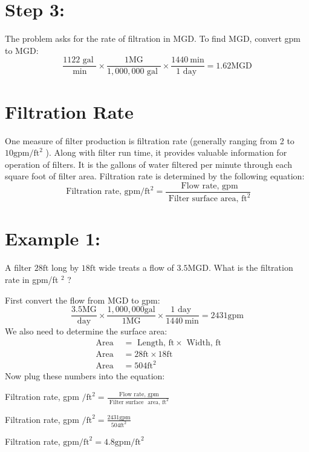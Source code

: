 \documentclass[10pt]{article}
\begin{document}
\section{Step 3:}
The problem asks for the rate of filtration in MGD. To find MGD, convert gpm to MGD:
$$
\frac{1122 \text { gal }}{\min } \times \frac{1 \mathrm{MG}}{1,000,000 \text { gal }} \times \frac{1440 \mathrm{~min}}{1 \text { day }}=1.62 \mathrm{MGD}
$$

\section{Filtration Rate}
One measure of filter production is filtration rate (generally ranging from 2 to $10 \mathrm{gpm} / \mathrm{ft}^{2}$ ). Along with filter run time, it provides valuable information for operation of filters. It is the gallons of water filtered per minute through each square foot of filter area. Filtration rate is determined by the following equation:
$$
\text { Filtration rate, } \mathrm{gpm} / \mathrm{ft}^{2}=\frac{\text { Flow rate, } \mathrm{gpm}}{\text { Filter surface area, } \mathrm{ft}^{2}}
$$

\section{Example 1:}
A filter $28 \mathrm{ft}$ long by $18 \mathrm{ft}$ wide treats a flow of $3.5 \mathrm{MGD}$. What is the filtration rate in gpm/ft ${ }^{2}$ ?

First convert the flow from MGD to gpm:
$$
\frac{3.5 \mathrm{MG}}{\text { day }} \times \frac{1,000,000 \mathrm{gal}}{1 \mathrm{MG}} \times \frac{1 \text { day }}{1440 \mathrm{~min}}=2431 \mathrm{gpm}
$$
We also need to determine the surface area:
$$
\begin{aligned}
\text { Area } &=\text { Length, } \mathrm{ft} \times \text { Width, } \mathrm{ft} \\
\text { Area } &=28 \mathrm{ft} \times 18 \mathrm{ft} \\
\text { Area } &=504 \mathrm{ft}^{2}
\end{aligned}
$$
Now plug these numbers into the equation:

Filtration rate, gpm $/ \mathrm{ft}^{2}=\frac{\text { Flow rate, } \mathrm{gpm}}{\text { Filter surface } \text { area, } \mathrm{ft}^{2}}$

Filtration rate, gpm $/ \mathrm{ft}^{2}=\frac{2431 \mathrm{gpm}}{504 \mathrm{ft}^{2}}$

Filtration rate, $\mathrm{gpm} / \mathrm{ft}^{2}=4.8 \mathrm{gpm} / \mathrm{ft}^{2}$
\end{document}
